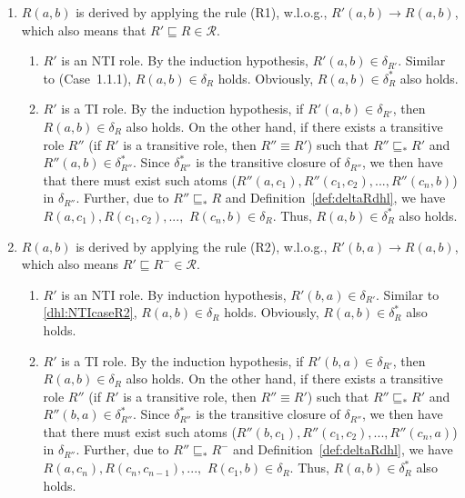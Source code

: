 \begin{enumerate}[leftmargin=12ex,label=Case~2.\arabic*, ref=Case~2.\arabic*]
\item $R(a,b)$ is derived by applying the rule (R1), w.l.o.g., $R'(a,b)\rightarrow R(a,b)$,
    which also means that $R'\sqsubseteq R\in\mathcal{R}$.\label{dhl:TcaseR1}
    \begin{enumerate}[leftmargin=8ex,label=Case~2.1.\arabic*]
    \item $R'$ is an NTI role. By the induction hypothesis, $R'(a,b)\in\delta_{R'}$.
        Similar to (Case~1.1.1), $R(a,b)\in\delta_{R}$ holds.
        Obviously, $R(a,b)\in\delta_{R}^*$ also holds.

    \item $R'$ is a TI role. By the induction hypothesis, if $R'(a,b)\in\delta_{R'}$,
        then $R(a,b)\in\delta_R$ also holds. On the other hand, if there exists a transitive role
        $R''$ (if $R'$ is a transitive role, then $R''\equiv R'$) such that
        $R''\sqsubseteq_* R'$ and $R''(a,b)\in\delta_{R''}^*$. Since $\delta_{R''}^*$ is
        the transitive closure of $\delta_{R''}$, we then have that there must
        exist such atoms ($R''(a,c_1),R''(c_1,c_2),...,R''(c_n,b)$) in $\delta_{R''}$.
        Further, due to $R''\sqsubseteq_* R$ and Definition~\ref{def:deltaRdhl},
        we have $R(a,c_1),R(c_1,c_2),...,$ $R(c_n,b)\in\delta_{R}$. Thus, $R(a,b)\in\delta_{R}^*$
        also holds.
    \end{enumerate}

\item $R(a,b)$ is derived by applying the rule (R2), w.l.o.g., $R'(b,a)\rightarrow R(a,b)$,
    which also means $R'\sqsubseteq R^-\in\mathcal{R}$.\label{dhl:TcaseR2}
    \begin{enumerate}[leftmargin=8ex,label=Case~2.2.\arabic*]
    \item $R'$ is an NTI role. By induction hypothesis, $R'(b,a)\in\delta_{R'}$.
        Similar to \ref{dhl:NTIcaseR2}, $R(a,b)\in\delta_{R}$ holds.
        Obviously, $R(a,b)\in\delta_{R}^*$ also holds.

    \item $R'$ is a TI role. By the induction hypothesis, if $R'(b,a)\in\delta_{R'}$,
        then $R(a,b)\in\delta_R$ also holds. On the other hand, if there exists a transitive role
        $R''$ (if $R'$ is a transitive role, then $R''\equiv R'$) such that
        $R''\sqsubseteq_* R'$ and $R''(b,a)\in\delta_{R''}^*$. Since $\delta_{R''}^*$ is
        the transitive closure of $\delta_{R''}$, we then have that there must
        exist such atoms ($R''(b,c_1),R''(c_1,c_2),...,R''(c_n,a)$) in $\delta_{R''}$.
        Further, due to $R''\sqsubseteq_* R^-$ and Definition~\ref{def:deltaRdhl},
        we have $R(a,c_n),R(c_n,c_{n-1}),...,$ $R(c_1,b)\in\delta_{R}$. Thus, $R(a,b)\in\delta_{R}^*$
        also holds.
    \end{enumerate}


\end{enumerate}
